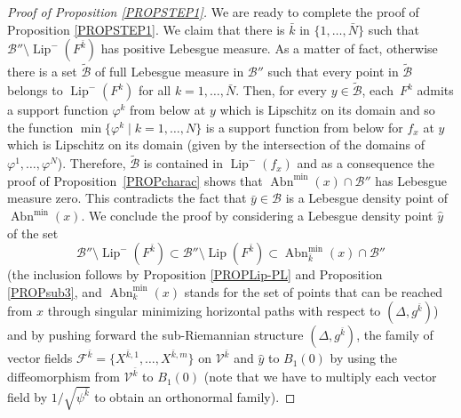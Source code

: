 \documentclass[JEP,XML,SOM,Unicode,NoFloatCountersInSection,published]{cedram}
\let\sep\mid
\DeclareMathOperator{\Abn}{Abn}
\DeclareMathOperator{\Lip}{Lip}
\theoremstyle{definition}
\begin{document}
\begin{proof}[Proof of Proposition \ref{PROPSTEP1}]
We are ready to complete the proof of Proposition \ref{PROPSTEP1}. We claim that there is $\bar{k}$ in $\{1,\ldots, \bar{N}\}$ such that $\mathcal{B}'' \setminus \Lip^-(F^{\bar{k}})$ has positive Lebesgue measure. As a matter of fact, otherwise there is a set $\tilde{\mathcal{B}}$ of full Lebesgue measure in $\mathcal{B}''$ such that every point in $\tilde{\mathcal{B}}$ belongs to $\Lip^-(F^k)$ for all $k=1, \ldots, \bar{N}$. Then, for every $y\in \tilde{\mathcal{B}}$, each~$F^k$ admits a support function $\varphi^k$ from below at $y$ which is Lipschitz on its domain and so the function $\min \{\varphi^k\sep  k=1,\ldots,N\}$ is a support function from below for $f_x$ at $y$ which is Lipschitz on its domain (given by the intersection of the domains of $\varphi^1, \ldots, \varphi^N$). Therefore, $\tilde{\mathcal{B}}$ is contained in $\Lip^-(f_x)$ and as a consequence the proof of Proposition~\ref{PROPcharac} shows that $\Abn^{\min}(x)\cap \mathcal{B}''$ has Lebesgue measure zero. This contradicts the fact that $\bar{y}\in \mathcal{B}$ is a Lebesgue density point of $\Abn^{\min}(x)$. We conclude the proof by considering a Lebesgue density point $\hat{y}$ of the set
\[
\mathcal{B}'' \setminus \Lip^-(F^{\bar{k}})\subset \mathcal{B}'' \setminus \Lip(F^{\bar{k}}) \subset \Abn_{\bar{k}}^{\min}(x)\cap \mathcal{B}''
\]
(the inclusion follows by Proposition \ref{PROPLip-PL} and Proposition \ref{PROPsub3}, and $\Abn_k^{\min}(x)$ stands for the set of points that can be reached from $x$ through singular minimizing horizontal paths with respect to $(\Delta,g^{\bar{k}})$)
and by pushing forward the sub-Riemannian structure $(\Delta,g^{\bar{k}})$, the family of vector fields $\mathcal{F}^{\bar{k}} = \{X^{\bar{k},1}, \ldots, X^{\bar{k},m}\}$ on $\mathcal{V}^{\bar{k}}$ and $\hat{y}$ to $B_1(0)$ by using the diffeomorphism from $\mathcal{V}^{\bar{k}}$ to $B_1(0)$ (note that we have to multiply each vector field by $1/\sqrt{\psi^{\bar{k}}}$ to obtain an orthonormal family).
\end{proof}
\end{document}
